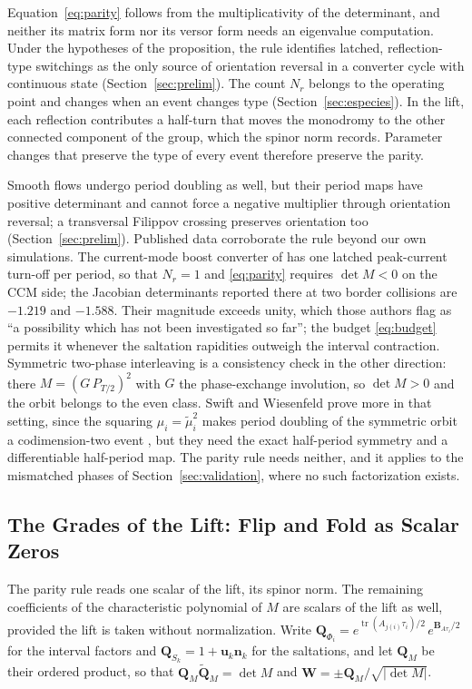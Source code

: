 \documentclass[journal]{IEEEtran}
\newcommand{\rev}[1]{\widetilde{#1}}
\begin{document}
Equation~\eqref{eq:parity} follows from the multiplicativity of the
determinant, and neither its matrix form nor its versor form needs an
eigenvalue computation. Under the hypotheses of the proposition, the rule
identifies latched, reflection-type switchings as the only source of
orientation reversal in a converter cycle with continuous state
(Section~\ref{sec:prelim}). The count $N_r$ belongs to the operating point
and changes when an event changes type (Section~\ref{sec:especies}). In
the lift, each reflection contributes a half-turn that moves the monodromy
to the other connected component of the group, which the spinor norm
records. Parameter changes that preserve the type of every event
therefore preserve the parity.

Smooth flows undergo period doubling as well, but their period maps have
positive determinant and cannot force a negative multiplier through
orientation reversal; a transversal Filippov crossing preserves orientation
too (Section~\ref{sec:prelim}). Published data corroborate the rule beyond
our own simulations. The current-mode boost converter of
\cite{parui2002border} has one latched peak-current turn-off per period, so that
$N_r=1$ and \eqref{eq:parity} requires $\det M<0$ on the CCM side; the
Jacobian determinants reported there at two border collisions are $-1.219$
and $-1.588$. Their magnitude exceeds unity, which those
authors flag as ``a possibility which has not been investigated so far'';
the budget \eqref{eq:budget} permits it whenever the saltation rapidities
outweigh the interval contraction. Symmetric two-phase interleaving is a
consistency check in the other direction: there $M=(G\,P_{T/2})^{2}$ with
$G$ the phase-exchange involution, so $\det M>0$ and the orbit belongs to
the even class. Swift and Wiesenfeld prove more in that setting, since the
squaring $\mu_i=\tilde\mu_i^{2}$ makes period doubling of the symmetric orbit
a codimension-two event \cite{swift1984suppression}, but they need the exact
half-period symmetry and a differentiable half-period map. The parity rule
needs neither, and it applies to the mismatched phases of
Section~\ref{sec:validation}, where no such factorization exists.

\subsection{The Grades of the Lift: Flip and Fold as Scalar Zeros}
\label{sec:grades}
The parity rule reads one scalar of the lift, its spinor norm. The remaining
coefficients of the characteristic polynomial of $M$ are scalars of the lift
as well, provided the lift is taken without normalization. Write
$\bm{Q}_{\Phi_i}=e^{\operatorname{tr}(A_{j(i)}\tau_i)/2}\,e^{\bm{B}_{A\tau_i}/2}$
for the interval factors and $\bm{Q}_{S_k}=1+\bm{u}_k\bm{n}_k$ for the
saltations, and let $\bm{Q}_M$ be their ordered product, so that
$\bm{Q}_M\rev{\bm{Q}}_M=\det M$ and $\bm{W}=\pm\bm{Q}_M/\sqrt{\lvert\det M\rvert}$.
\end{document}
